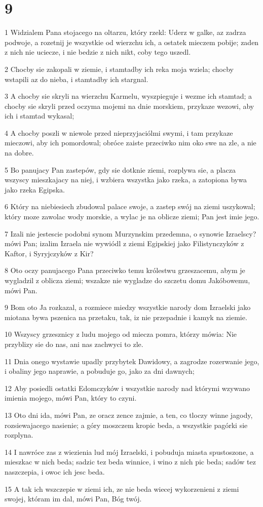 \chapter{9}

\par 1 Widzialem Pana stojacego na oltarzu, który rzekl: Uderz w galke, az zadrza podwoje, a rozetnij je wszystkie od wierzchu ich, a ostatek mieczem pobije; zaden z nich nie uciecze, i nie bedzie z nich nikt, coby tego uszedl.
\par 2 Chocby sie zakopali w ziemie, i stamtadby ich reka moja wziela; chocby wstapili az do nieba, i stamtadby ich stargnal.
\par 3 A chocby sie skryli na wierzchu Karmelu, wyszpieguje i wezme ich stamtad; a chocby sie skryli przed oczyma mojemi na dnie morskiem, przykaze wezowi, aby ich i stamtad wykasal;
\par 4 A chocby poszli w niewole przed nieprzyjaciólmi swymi, i tam przykaze mieczowi, aby ich pomordowal; obróce zaiste przeciwko nim oko swe na zle, a nie na dobre.
\par 5 Bo panujacy Pan zastepów, gdy sie dotknie ziemi, rozplywa sie, a placza wszyscy mieszkajacy na niej, i wzbiera wszystka jako rzeka, a zatopiona bywa jako rzeka Egipska.
\par 6 Który na niebiesiech zbudowal palace swoje, a zastep swój na ziemi uszykowal; który moze zawolac wody morskie, a wylac je na oblicze ziemi; Pan jest imie jego.
\par 7 Izali nie jestescie podobni synom Murzynskim przedemna, o synowie Izraelscy? mówi Pan; izalim Izraela nie wywiódl z ziemi Egipskiej jako Filistynczyków z Kaftor, i Syryjczyków z Kir?
\par 8 Oto oczy panujacego Pana przeciwko temu królestwu grzeszacemu, abym je wygladzil z oblicza ziemi; wszakze nie wygladze do szczetu domu Jakóbowemu, mówi Pan.
\par 9 Bom oto Ja rozkazal, a rozmiece miedzy wszystkie narody dom Izraelski jako miotana bywa pszenica na przetaku, tak, iz nie przepadnie i kamyk na ziemie.
\par 10 Wszyscy grzesznicy z ludu mojego od miecza pomra, którzy mówia: Nie przyblizy sie do nas, ani nas zachwyci to zle.
\par 11 Dnia onego wystawie upadly przybytek Dawidowy, a zagrodze rozerwanie jego, i obaliny jego naprawie, a pobuduje go, jako za dni dawnych;
\par 12 Aby posiedli ostatki Edomczyków i wszystkie narody nad którymi wzywano imienia mojego, mówi Pan, który to czyni.
\par 13 Oto dni ida, mówi Pan, ze oracz zence zajmie, a ten, co tloczy winne jagody, rozsiewajacego nasienie; a góry moszczem kropic beda, a wszystkie pagórki sie rozplyna.
\par 14 I nawróce zas z wiezienia lud mój Izraelski, i pobuduja miasta spustoszone, a mieszkac w nich beda; sadzic tez beda winnice, i wino z nich pic beda; sadów tez naszczepia, i owoc ich jesc beda.
\par 15 A tak ich wszczepie w ziemi ich, ze nie beda wiecej wykorzenieni z ziemi swojej, któram im dal, mówi Pan, Bóg twój.


